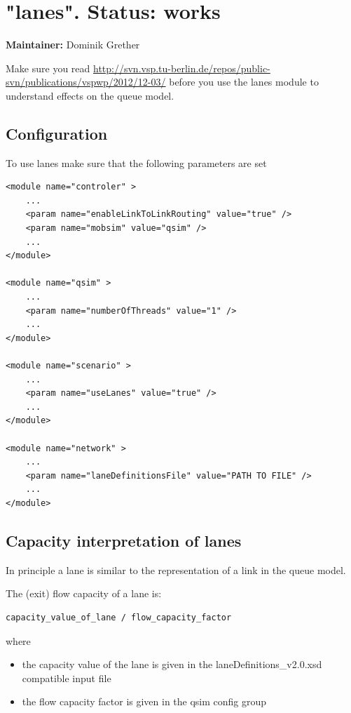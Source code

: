 \vfill\eject
\section{"lanes". Status: works}

\textbf{Maintainer:} Dominik Grether

Make sure you read \url{http://svn.vsp.tu-berlin.de/repos/public-svn/publications/vspwp/2012/12-03/} before you use the lanes module to understand effects on the queue model.

\subsection{Configuration}

To use lanes make sure that the following parameters are set

\begin{verbatim}
<module name="controler" >	
	...
	<param name="enableLinkToLinkRouting" value="true" />
	<param name="mobsim" value="qsim" />
	...
</module>

<module name="qsim" >
	...
	<param name="numberOfThreads" value="1" />
	...
</module>

<module name="scenario" >
	...
	<param name="useLanes" value="true" />
	...
</module>

<module name="network" >
	...
	<param name="laneDefinitionsFile" value="PATH TO FILE" />
	...
</module>
\end{verbatim}

\subsection{Capacity interpretation of lanes}

In principle a lane is similar to the representation of a link in the queue model. 

The (exit) flow capacity of a lane is:

\begin{verbatim}
capacity_value_of_lane / flow_capacity_factor
\end{verbatim}

where
\begin{itemize}
	\item the capacity value of the lane is given in the laneDefinitions\_v2.0.xsd compatible input file
	\item the flow capacity factor is given in the qsim config group
\end{itemize}

